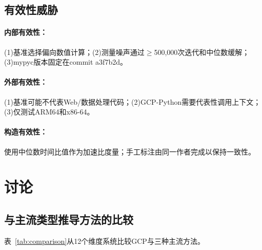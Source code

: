 \documentclass[UTF8]{article}
\begin{document}
\subsection{有效性威胁}

\paragraph{内部有效性：}(1)基准选择偏向数值计算；(2)测量噪声通过$\geq$500,000次迭代和中位数缓解；(3)mypyc版本固定在commit a3f7b2d。

\paragraph{外部有效性：}(1)基准可能不代表Web/数据处理代码；(2)GCP-Python需要代表性调用上下文；(3)仅测试ARM64和x86-64。

\paragraph{构造有效性：}使用中位数时间比值作为加速比度量；手工标注由同一作者完成以保持一致性。

\section{讨论}

\subsection{与主流类型推导方法的比较}

表~\ref{tab:comparison}从12个维度系统比较GCP与三种主流方法。
\end{document}
